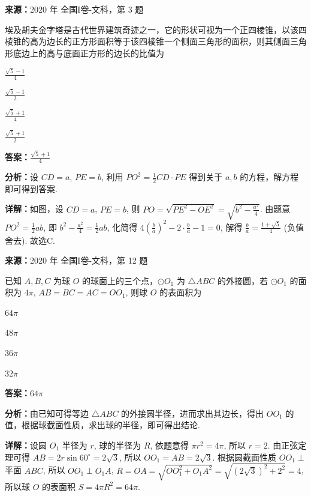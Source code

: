 \begin{question}[points=5]
\textbf{来源：}2020 年 全国I卷-文科，第 3 题\par
埃及胡夫金字塔是古代世界建筑奇迹之一，它的形状可视为一个正四棱锥，以该四棱锥的高为边长的正方形面积等于该四棱锥一个侧面三角形的面积，则其侧面三角形底边上的高与底面正方形的边长的比值为
\begin{choices}
  \item $\frac{\sqrt{5} - 1}{4}$
  \item $\frac{\sqrt{5} - 1}{2}$
  \item $\frac{\sqrt{5} + 1}{4}$
  \item $\frac{\sqrt{5} + 1}{2}$
\end{choices}
\begin{solution}
\textbf{答案：}$\frac{\sqrt{5} + 1}{4}$

\textbf{分析：}设 $CD = a$, $PE = b$, 利用 $PO^2 = \frac{1}{2} CD \cdot PE$ 得到关于 $a, b$ 的方程，解方程即可得到答案.

\textbf{详解：}如图，设 $CD = a$, $PE = b$, 则 $PO = \sqrt{PE^2 - OE^2} = \sqrt{b^2 - \frac{a^2}{4}}$. 由题意 $PO^2 = \frac{1}{2} ab$, 即 $b^2 - \frac{a^2}{4} = \frac{1}{2} ab$, 化简得 $4\left(\frac{b}{a}\right)^2 - 2\cdot \frac{b}{a} - 1 = 0$, 解得 $\frac{b}{a} = \frac{1+\sqrt{5}}{4}$ (负值舍去). 故选C.
\end{solution}
\end{question}

\begin{question}[points=5]
\textbf{来源：}2020 年 全国I卷-文科，第 12 题\par
已知 $A, B, C$ 为球 $O$ 的球面上的三个点，$\odot O_1$ 为 $\triangle ABC$ 的外接圆，若 $\odot O_1$ 的面积为 $4\pi$, $AB = BC = AC = OO_1$, 则球 $O$ 的表面积为
\begin{choices}
  \item $64\pi$
  \item $48\pi$
  \item $36\pi$
  \item $32\pi$
\end{choices}
\begin{solution}
\textbf{答案：}$64\pi$

\textbf{分析：}由已知可得等边 $\triangle ABC$ 的外接圆半径，进而求出其边长，得出 $OO_1$ 的值，根据球截面性质，求出球的半径，即可得出结论.

\textbf{详解：}设圆 $O_1$ 半径为 $r$, 球的半径为 $R$, 依题意得 $\pi r^2 = 4\pi$, 所以 $r=2$. 由正弦定理可得 $AB = 2r\sin 60^\circ = 2\sqrt{3}$, 所以 $OO_1 = AB = 2\sqrt{3}$. 根据圆截面性质 $OO_1 \perp$ 平面 $ABC$, 所以 $OO_1 \perp O_1A$, $R = OA = \sqrt{OO_1^2 + O_1A^2} = \sqrt{(2\sqrt{3})^2 + 2^2} = 4$, 所以球 $O$ 的表面积 $S = 4\pi R^2 = 64\pi$.
\end{solution}
\end{question}

